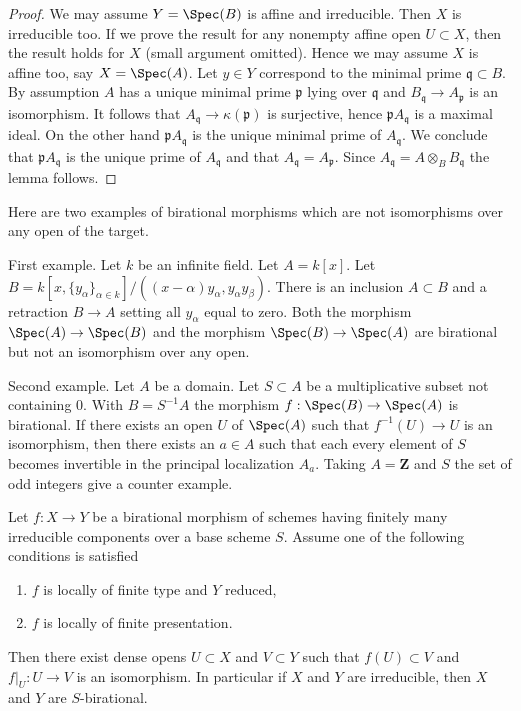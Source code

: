 \begin{proof}
We may assume $Y = \Spec(B)$ is affine and irreducible.
Then $X$ is irreducible too. If we prove the result for any nonempty
affine open $U \subset X$, then the result holds for $X$
(small argument omitted). Hence we may assume $X$
is affine too, say $X = \Spec(A)$.
Let $y \in Y$ correspond to the minimal prime $\mathfrak q \subset B$.
By assumption $A$ has a unique minimal prime $\mathfrak p$ lying
over $\mathfrak q$ and $B_\mathfrak q \to A_\mathfrak p$ is an isomorphism.
It follows that $A_\mathfrak q \to \kappa(\mathfrak p)$ is surjective,
hence $\mathfrak p A_\mathfrak q$ is a maximal ideal. On the other hand
$\mathfrak p A_\mathfrak q$ is the unique minimal prime of $A_\mathfrak q$.
We conclude that $\mathfrak p A_\mathfrak q$ is the unique prime of
$A_\mathfrak q$ and that $A_\mathfrak q = A_\mathfrak p$. Since
$A_\mathfrak q = A \otimes_B B_\mathfrak q$ the lemma follows.
\end{proof}

\begin{example}
\label{example-birational-not-iso-over-open}
Here are two examples of birational morphisms which are not isomorphisms
over any open of the target.

\medskip\noindent
First example. Let $k$ be an infinite field. Let $A = k[x]$. Let
$B = k[x, \{y_{\alpha}\}_{\alpha \in k}]/
((x-\alpha)y_\alpha, y_\alpha y_\beta)$.
There is an inclusion $A \subset B$ and a retraction $B \to A$
setting all $y_\alpha$ equal to zero.
Both the morphism $\Spec(A) \to \Spec(B)$
and the morphism $\Spec(B) \to \Spec(A)$ are birational
but not an isomorphism over any open.

\medskip\noindent
Second example. Let $A$ be a domain. Let $S \subset A$ be a multiplicative
subset not containing $0$.
With $B = S^{-1}A$ the morphism $f : \Spec(B) \to \Spec(A)$
is birational. If there exists an open $U$ of $\Spec(A)$
such that $f^{-1}(U) \to U$ is an isomorphism, then there exists an
$a \in A$ such that each every element of $S$ becomes invertible
in the principal localization $A_a$. Taking $A = \mathbf{Z}$
and $S$ the set of odd integers give a counter example.
\end{example}

\begin{lemma}
\label{lemma-birational-birational}
Let $f : X \to Y$ be a birational morphism of schemes having finitely
many irreducible components over a base scheme $S$. Assume one of the
following conditions is satisfied
\begin{enumerate}
\item $f$ is locally of finite type and $Y$ reduced,
\item $f$ is locally of finite presentation.
\end{enumerate}
Then there exist dense opens $U \subset X$ and $V \subset Y$
such that $f(U) \subset V$ and $f|_U : U \to V$ is an isomorphism.
In particular if $X$ and $Y$ are irreducible, then
$X$ and $Y$ are $S$-birational.
\end{lemma}

